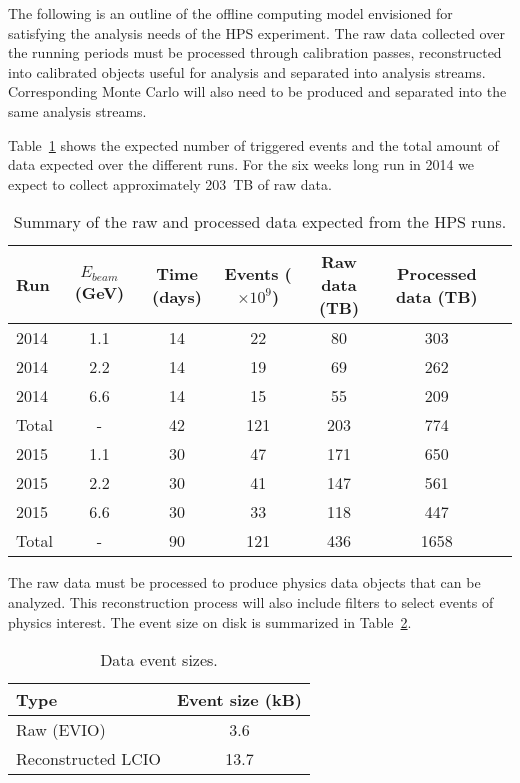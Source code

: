 
The following is an outline of the offline computing model envisioned for satisfying the analysis needs of the HPS experiment. The raw data collected over the running periods must be processed through calibration passes, reconstructed into calibrated objects useful for analysis and separated into analysis streams. Corresponding Monte Carlo will also need to be produced and separated into the same analysis streams.

Table~\ref{tab:data_volume} shows the expected number of triggered events and
the total amount of data expected over the 
different runs. For the six weeks long run in 2014 we expect to collect approximately 203~TB of raw data.
\begin{table}[]
\centering
\begin{tabular}{|l|c|c|c|c|c|c|}
\hline
Run & $E_{beam}$ (GeV) & Time (days) & Events ($\times 10^9$) & Raw data (TB) & Processed data (TB)\\
\hline
2014 & 1.1 & 14 & 22 & 80 & 303 \\
2014 & 2.2 & 14 & 19 & 69 & 262  \\
2014 & 6.6 & 14 & 15 & 55 & 209  \\
\hline
Total & - & 42 & 121 & 203  & 774 \\
\hline
2015 & 1.1 & 30 & 47 & 171 & 650 \\
2015 & 2.2 & 30 & 41 & 147 & 561 \\
2015 & 6.6 & 30 & 33 & 118 & 447 \\
\hline
Total & - & 90 & 121 & 436 & 1658 \\
\hline
\end{tabular}
\caption{{\small Summary of the raw and processed data expected from the HPS runs. }}
\label{tab:data_volume}
\end{table}
The raw data must be processed to produce physics data objects that can be analyzed. This reconstruction process will also include filters to select events of physics interest. The event size on disk is summarized 
in Table~\ref{tab:raw_data_size}. 
\begin{table}[]
\centering
\begin{tabular}{|l|c|}
\hline
Type & Event size (kB) \\ 
\hline
Raw (EVIO)  &  3.6 \\
\hline
Reconstructed LCIO & 13.7 \\
\hline
\end{tabular}
\caption{{\small Data event sizes. }}
\label{tab:raw_data_size}
\end{table}

